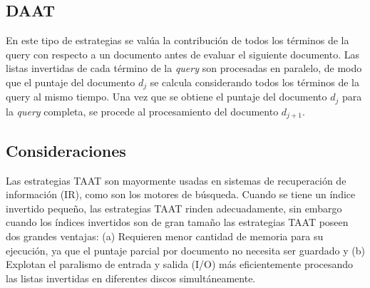 \subsection{DAAT}
En este tipo de estrategias se valúa la contribución de todos los términos de la query con respecto a un documento antes de evaluar el siguiente documento. Las listas invertidas de cada término de la \textit{query} son procesadas en paralelo, de modo que el puntaje del documento $d_{j}$ se calcula considerando todos los términos de la query al mismo tiempo. Una vez que se obtiene el puntaje del documento $d_{j}$ para la \textit{query} completa, se procede al procesamiento del documento $d_{j+1}$.

\subsection{Consideraciones}
Las estrategias TAAT son mayormente usadas en sistemas de recuperación de información (IR), como son los motores de búsqueda. 
Cuando se tiene un índice invertido pequeño, las estrategias TAAT rinden adecuadamente, sin embargo cuando los índices invertidos son de gran tamaño las estrategias TAAT poseen dos grandes ventajas: (a) Requieren menor cantidad de memoria para su ejecución, ya que el puntaje parcial por documento no necesita ser guardado y (b) Explotan el paralismo de entrada y salida (I/O) más eficientemente procesando las listas invertidas en diferentes discos simultáneamente.
